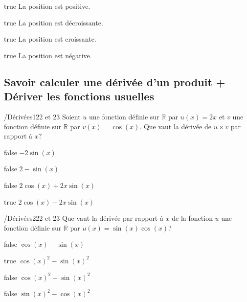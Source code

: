 \documentclass[11pt]{article}
\begin{document}
            \begin{reponses}
                \item[true] La position est positive.
                \item[true] La position est décroissante.
                \item[true] La position est croissante.
                \item[true] La position est négative.
            \end{reponses}

        \subsection{Savoir calculer une dérivée d'un produit + Dériver les fonctions usuelles}
        
        	\begin{question}{/}{Dérivées}{1}{22 et 23}
				Soient $u$ une fonction définie sur $\mathbb{R}$ par $u(x)=2x$ et $v$ une fonction définie sur $\mathbb{R}$ par  $v(x)=\cos(x)$. Que vaut la dérivée de $u\times v$ par rapport à $x$?
            \end{question}

            \begin{reponses}
            	\item[false] $-2\sin(x)$
            	\item[false] $2-\sin(x)$
                \item[false] $2\cos(x)+2x\sin(x)$
                \item[true] $2\cos(x)-2x\sin(x)$
            \end{reponses}

            \begin{question}{/}{Dérivées}{2}{22 et 23}
                Que vaut la dérivée par rapport à $x$ de la fonction $u$ une fonction définie sur $\mathbb{R}$ par $u(x)=\sin(x)\cos(x)$?
            \end{question}

            \begin{reponses}
                \item[false] $\cos(x)-\sin(x)$
                \item[true] $\cos(x)^2-\sin(x)^2$
                \item[false] $\cos(x)^2+\sin(x)^2$
                \item[false] $\sin(x)^2-\cos(x)^2$
            \end{reponses}
\end{document}
